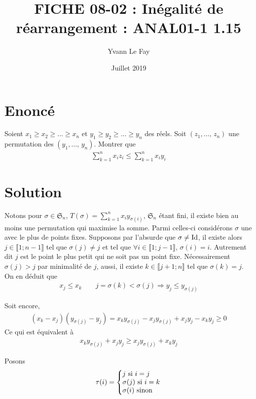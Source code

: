 \documentclass{article}
\begin{document}
\title{FICHE 08-02 : Inégalité de réarrangement : ANAL01-1 1.15}
\author{Yvann Le Fay}
\date{Juillet 2019}
\maketitle

\section*{Enoncé}
Soient $x_1\geq x_2\geq \ldots\geq x_n$ et $y_1\geq y_2\geq \ldots\geq y_n$ des réels. Soit $(z_1,\ldots,\, z_n)$ une permutation des $(y_1,\ldots,\, y_n)$. 
Montrer que
\begin{align*}
	\sum_{k=1}^n x_i z_i\leq \sum_{k=1}^n x_i y_i
\end{align*}
\section*{Solution}
Notons pour $\sigma\in\mathfrak{S}_n$, $T(\sigma) = \sum_{k=1}^n x_i y_{\sigma(i)}$, $\mathfrak{S}_n$ étant fini, il existe bien au moins une permutation qui maximise la somme. Parmi celles-ci considérons $\sigma$ une avec le plus de points fixes. Supposons par l'absurde que $\sigma \neq \textup{Id}$, il existe alors $j\in \llbracket 1;n-1\rrbracket$ tel que $\sigma(j)\neq j$ et tel que $\forall i \in\llbracket 1;j-1\rrbracket$, $\sigma(i)=i$. Autrement dit $j$ est le point le plus petit qui ne soit pas un point fixe. Nécessairement $\sigma(j)>j$ par minimalité de $j$, aussi, il existe $k\in\llbracket j+1;n\rrbracket$ tel que $\sigma(k)=j$. On en déduit que
\begin{align*}
x_j\leq x_k\qquad j = \sigma(k)<\sigma(j) \Rightarrow y_{j}\leq y_{\sigma(j)}
\end{align*}

Soit encore, 
\begin{align*}
	(x_k-x_j)(y_{\sigma(j)}-y_{j}) = x_ky_{\sigma(j)} -x_jy_{\sigma(j)}+x_jy_{j}-x_ky_{j} \geq 0
\end{align*}
Ce qui est équivalent à 
\begin{align}
	x_ky_{\sigma(j)}+x_jy_{j}\geq x_jy_{\sigma(j)}+x_ky_{j}
\end{align}

Posons 
\begin{align*}
	\tau(i) = 
\left\{
     \begin{array}{@{}l@{\thinspace}l}
	     j \textup{ si } i = j\\
	     \sigma(j) \textup{ si } i = k\\
	     \sigma(i) \textup{ sinon }
     \end{array}
   \right.   	
\end{align*}
\end{document}
